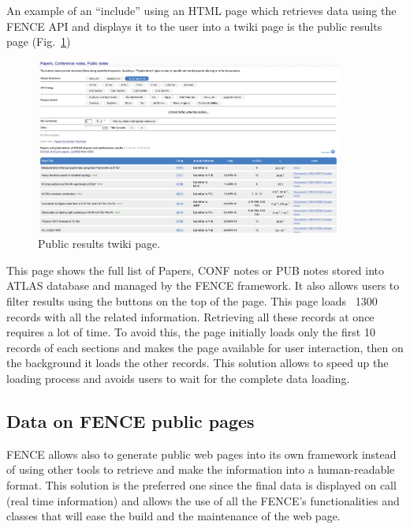 An example of an “include” using an HTML page which retrieves data using the FENCE API and displays it to the user into a twiki page is the public results page (Fig.~\ref{fig:public_twikipage})
\begin{figure}[ht!]
  \centering
  \includegraphics[width=0.9\textwidth]{figures/public_twikipage.png}
  \caption{Public results twiki page.}
  \label{fig:public_twikipage}
\end{figure}

This page shows the full list of Papers, CONF notes or PUB notes stored into ATLAS database and managed by the FENCE framework. It also allows users to filter results using the buttons on the top of the page. This page loads ~1300 records with all the related information. Retrieving all these records at once requires a lot of time. To avoid this, the page initially loads only the first 10 records of each sections and makes the page available for user interaction, then on the background it loads the other records. This solution allows to speed up the loading process and avoids users to wait for the complete data loading.

\subsection{Data on FENCE public pages}
\label{sec:Data_on_FENCE_public_pages}

FENCE allows also to generate public web pages into its own framework instead of using other tools to retrieve and make the information into a human-readable format. This solution is the preferred one since the final data is displayed on call (real time information) and allows the use of all the FENCE’s functionalities and classes that will ease the build and the maintenance of the web page.

